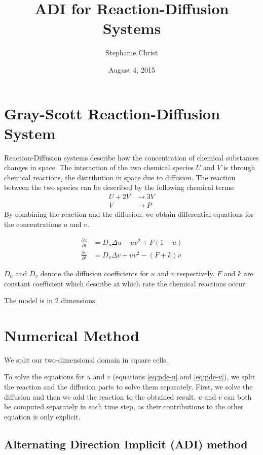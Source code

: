 \documentclass[a4paper]{article}
\title{ADI for Reaction-Diffusion Systems}
\author{Stephanie Christ}
\date{August 4, 2015}
\begin{document}
\maketitle


\section{Gray-Scott Reaction-Diffusion System}

Reaction-Diffusion systems describe how the concentration of chemical substances changes in space.
The interaction of the two chemical species $U$ and $V$ is through chemical reactions, the distribution in space due to diffusion.
The reaction between the two species can be described by the following chemical terms:
\begin{align*}
	U + 2V &\rightarrow 3V \\
	V &\rightarrow P
\end{align*}
By combining the reaction and the diffusion, we obtain differential equations for the concentrations $u$ and $v$.

\begin{align}
	\frac{\partial u}{\partial t} &= D_u \Delta u - uv^2 + F(1-u) \label{eq:pde-u}\\
	\frac{\partial v}{\partial t} &= D_v \Delta v + uv^2 - (F+k)v	 \label{eq:pde-v}
\end{align}

$D_u$ and $D_v$ denote the diffusion coefficients for $u$ and $v$ respectively.
$F$ and $k$ are constant coefficient which describe at which rate the chemical reactions occur.

The model is in 2 dimensions.



\section{Numerical Method}

We split our two-dimensional domain in square cells.

To solve the equations for $u$ and $v$ (equations \ref{eq:pde-u} and \ref{eq:pde-v}), we split the reaction and the diffusion parts to solve them separately.
First, we solve the diffusion and then we add the reaction to the obtained result.
$u$ and $v$ can both be computed separately in each time step, as their contributions to the other equation is only explicit.


\subsection{Alternating Direction Implicit (ADI) method}
\end{document}
